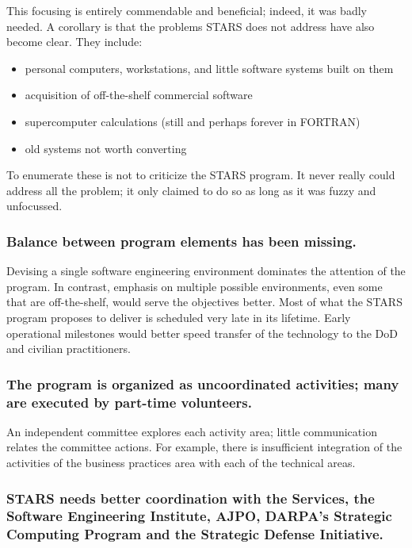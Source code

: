 \documentclass[12pt,final]{article}
\begin{document}
This focusing is entirely commendable and beneficial; indeed, it was badly
needed. A corollary is that the problems STARS does not address have also
become clear. They include:

\begin{itemize}
    \item personal computers, workstations, and little software systems built on them
    \item acquisition of off-the-shelf commercial software
    \item supercomputer calculations (still and perhaps forever in FORTRAN)
    \item old systems not worth converting
\end{itemize}

To enumerate these is not to criticize the STARS program. It never really could
address all the problem; it only claimed to do so as long as it was fuzzy and
unfocussed.

\subsubsection*{Balance between program elements has been missing.}

Devising a single software engineering environment dominates the attention of
the program. In contrast, emphasis on multiple possible environments, even some
that are off-the-shelf, would serve the objectives better. Most of what the
STARS program proposes to deliver is scheduled very late in its lifetime. Early
operational milestones would better speed transfer of the technology to the DoD
and civilian practitioners.

\subsubsection*{The program is organized as uncoordinated activities; many are executed
by part-time volunteers.}

An independent committee explores each activity area; little communication
relates the committee actions. For example, there is insufficient integration
of the activities of the business practices area with each of the technical
areas.

\subsubsection*{STARS needs better coordination with the Services, the Software
Engineering Institute, AJPO, DARPA’s Strategic Computing Program and the
Strategic Defense Initiative.}
\end{document}
